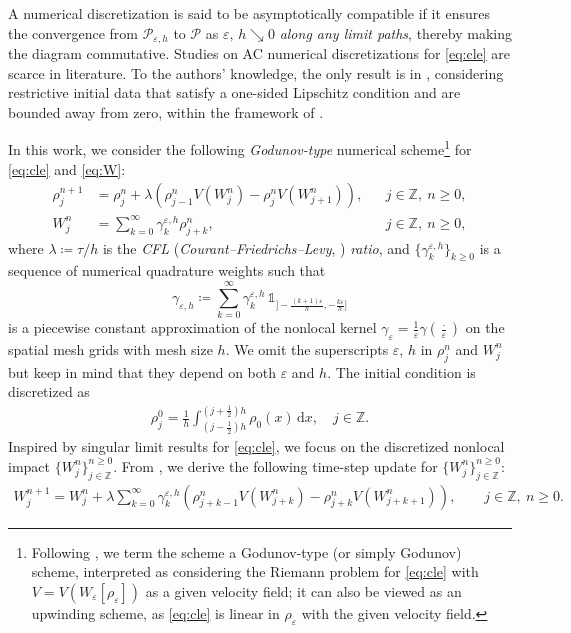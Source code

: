 \documentclass[10pt]{amsart}
\theoremstyle{plain}
\theoremstyle{definition}
\numberwithin{equation}{section}
\newcommand{\eps}{{\varepsilon}}
\newcommand{\dx}{{\, \mathrm{d}x}}
\begin{document}
A numerical discretization is said to be asymptotically compatible if it ensures the convergence from $\mathcal{P}_{\eps,h}$ to $\mathcal{P}$ as $\eps,\, h \searrow 0$ \emph{along any limit paths}, thereby making the diagram commutative.
Studies on AC numerical discretizations for \cref{eq:cle} are scarce in literature. To the authors' knowledge, the only result is in \cite{MR4742183}, considering restrictive initial data that satisfy a one-sided Lipschitz condition and are bounded away from zero, within the framework of \cite{MR4300935}.

In this work, we consider the following \textit{Godunov-type} numerical scheme\footnote{Following \cite{MR3917881}, we term the scheme a Godunov-type (or simply Godunov) scheme, interpreted as considering the Riemann problem for \cref{eq:cle} with $V=V(W_{\eps}[\rho_\eps])$ as a given velocity field; it can also be viewed as an upwinding scheme, as \cref{eq:cle} is linear in $\rho_\eps$ with the given velocity field.} for \cref{eq:cle} and \cref{eq:W}:
\begin{align} \label{eq:godunov}
\rho_j^{n+1}&=\rho_j^n+\lambda (\rho_{j-1}^n V(W_j^n) -\rho_j^n V(W_{j+1}^n)), && j \in \mathbb Z, \ n\geq0,\\
 \label{eq:num_nonlocal_W}
    W_j^n &= \sum_{k=0}^\infty \gamma_k^{\eps,h} \rho_{j+k}^n, && j \in \mathbb Z, \ n\geq0,
\end{align}
where $\lambda\coloneqq \tau/h$ is the \textit{CFL} (\textit{Courant--Friedrichs--Levy}, \cite{MR1512478,MR213764}) \textit{ratio}, and $\{\gamma_k^{\eps,h}\}_{k\ge0}$ is a sequence of numerical quadrature weights such that 
$$
\gamma_{\eps,h} \coloneqq \sum_{k=0}^\infty \gamma_k^{\eps,h} \, \mathds{1}_{]- \frac{(k+1)\eps}h, - \frac{k\eps}h]}
$$
is a piecewise constant approximation of the nonlocal kernel $\gamma_\eps =\tfrac{1}{\varepsilon} \gamma\left(\tfrac{\cdot}{\eps}\right)$ on the spatial mesh grids with mesh size $h$. 
We omit the superscripts $\eps,\,h$ in $\rho_j^n$ and $W_j^n$ but keep in mind that they depend on both $\eps$ and $h$.
The initial condition is discretized as
\begin{align}\label{eq:ini_cond_discrete}
    \rho_j^0 = \frac1h\int_{(j-\frac12)h}^{(j+\frac12)h} \rho_0(x)\dx, \quad j\in\mathbb{Z}.
\end{align}
Inspired by singular limit results for \cref{eq:cle}, we focus on the discretized nonlocal impact $\{W_j^n\}_{j \in \mathbb Z}^{n \ge 0}$.
From , we derive the following time-step update for $\{W_j^n\}_{j \in \mathbb Z}^{n \ge 0}$:
\begin{align}\label{eq:W-2}
    W_j^{n+1} = W_j^n + \lambda \sum_{k=0}^\infty \gamma_k^{\eps,h} \left( \rho_{j+k-1}^n V(W_{j+k}^n) - \rho_{j+k}^n V(W_{j+k+1}^n) \right), \qquad j \in \mathbb Z, \ n\geq0.
\end{align}
\end{document}
